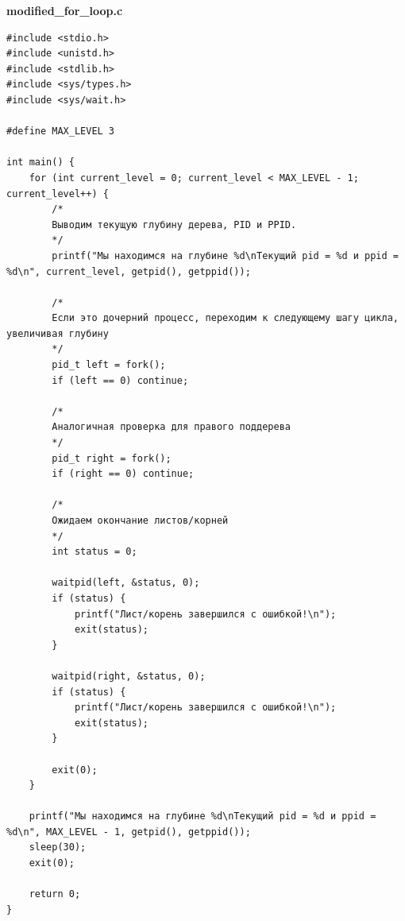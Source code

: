 \documentclass[a4paper,14pt]{extarticle}
\begin{document}
\textbf{modified\_for\_loop.c}
\begin{verbatim}
#include <stdio.h>
#include <unistd.h>
#include <stdlib.h>
#include <sys/types.h>
#include <sys/wait.h>

#define MAX_LEVEL 3

int main() {
    for (int current_level = 0; current_level < MAX_LEVEL - 1; current_level++) {
        /*
        Выводим текущую глубину дерева, PID и PPID.
        */
        printf("Мы находимся на глубине %d\nТекущий pid = %d и ppid = %d\n", current_level, getpid(), getppid());

        /*
        Если это дочерний процесс, переходим к следующему шагу цикла, увеличивая глубину
        */
        pid_t left = fork();
        if (left == 0) continue;
        
        /*
        Аналогичная проверка для правого поддерева
        */
        pid_t right = fork();
        if (right == 0) continue;

        /*
        Ожидаем окончание листов/корней
        */
        int status = 0;

        waitpid(left, &status, 0);
        if (status) { 
            printf("Лист/корень завершился с ошибкой!\n");
            exit(status);
        }

        waitpid(right, &status, 0);
        if (status) { 
            printf("Лист/корень завершился с ошибкой!\n");
            exit(status);
        }

        exit(0);
    }

    printf("Мы находимся на глубине %d\nТекущий pid = %d и ppid = %d\n", MAX_LEVEL - 1, getpid(), getppid());
    sleep(30);
    exit(0); 

    return 0;
}
\end{verbatim}
\end{document}
